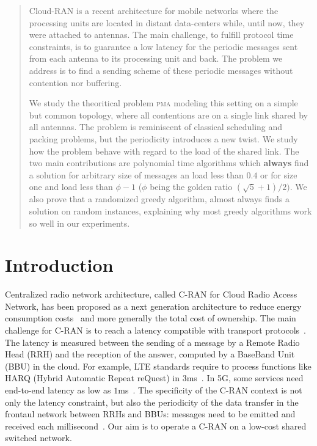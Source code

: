 \documentclass[a4paper,UKenglish,cleveref, autoref, thm-restate]{lipics-v2019}
\newcommand\pma{\textsc{pma}\xspace}
\begin{document}
\begin{abstract}
Cloud-RAN is a recent architecture for mobile networks where the processing units are located in distant data-centers while, until now, they were attached to antennas. The main challenge, to fulfill protocol time constraints, is to guarantee a low latency for the periodic messages sent from each antenna to its processing unit and back. The problem we address is to find a sending scheme of these periodic messages without contention nor buffering.

We study the theoritical problem \pma modeling this setting on a simple but common topology, where all contentions are on a single link shared by all antennas. The problem is reminiscent of classical scheduling and packing problems, but the periodicity introduces a new twist. We study how the problem behave with regard to the load of the shared link.
The two main contributions are polynomial time algorithms which \textbf{always} find a solution for arbitrary size of messages an load less than $0.4$ or for size one and load less than $\phi - 1$ ($\phi$ being the golden ratio $(\sqrt{5}+1)/2)$. We also prove that a randomized greedy algorithm, almost always finds a solution on random instances, explaining why most greedy algorithms work so well in our experiments.
\end{abstract}

\section{Introduction}
Centralized radio network architecture, called C-RAN for Cloud Radio Access Network, has been proposed as a next generation architecture to reduce energy consumption costs~\cite{mobile2011c} and more generally the total cost of ownership. The main challenge for C-RAN is to reach a latency compatible with transport protocols~\cite{ieeep802}. The latency is measured between the sending of a message by a Remote Radio Head (RRH) and the reception of the answer, computed by a BaseBand Unit (BBU) in the cloud. For example, LTE standards require to process functions like HARQ (Hybrid Automatic Repeat reQuest) in $3$ms~\cite{bouguen2012lte}. In 5G, some services need end-to-end latency as low as $1$ms~\cite{3gpp5g,boccardi2014five}. The specificity of the C-RAN context is not only the latency constraint, but also the periodicity of the data transfer in the frontaul network between RRHs and BBUs: messages need to be emitted and received each millisecond~\cite{bouguen2012lte}. Our aim is to operate a C-RAN on a low-cost shared switched network.
\end{document}

